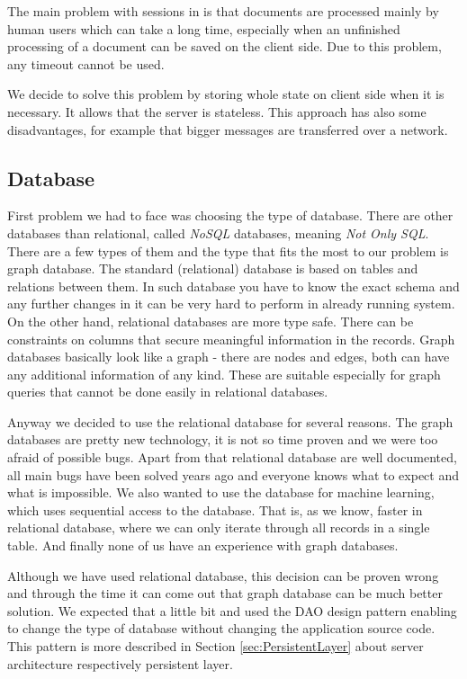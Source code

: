 The main problem with sessions in \textan{} is that documents are processed mainly
by human users which can take a long time, especially when an unfinished processing
of a document can be saved on the client side. Due to this problem, any timeout
cannot be used.

We decide to solve this problem by storing whole state on client side when it is
necessary. It allows that the server is stateless. This approach has also some
disadvantages, for example that bigger messages are transferred over a network.

\subsection{Database}

First problem we had to face was choosing the type of database. There are other databases than relational, called \emph{NoSQL} databases,
meaning \emph{Not Only SQL}. There are a few types of them and the type that
fits the most to our problem is graph database. The standard (relational)
database is based on tables and relations between them. In such
database you have to know the exact schema and any further changes in
it can be very hard to perform in already running system. On the other hand,
relational databases are more type safe. There can be constraints on
columns that secure meaningful information in the records. Graph databases
basically look like a graph - there are nodes and edges, both can have any
additional information of any kind. These are suitable especially for graph
queries that cannot be done easily in relational databases.

Anyway we decided to use the relational database for several reasons.
The graph databases are pretty new technology, it is not so time proven and we
were too afraid of possible bugs. Apart from that relational database are well
documented, all main bugs have been solved years ago and everyone knows what to
expect and what is impossible.
We also wanted to use the database for machine learning, which uses sequential
access to the database. That is, as we know, faster in relational database,
where we can only iterate through all records in a single table.
And finally none of us have an experience with graph databases.

Although we have used relational database, this decision can be proven wrong and
through the time it can come out that graph database can be much better
solution. We expected that a little bit and used the DAO design pattern enabling
to change the type of database without changing the application source code.
This pattern is more described in Section \ref{sec:PersistentLayer} about server
architecture respectively persistent layer.

